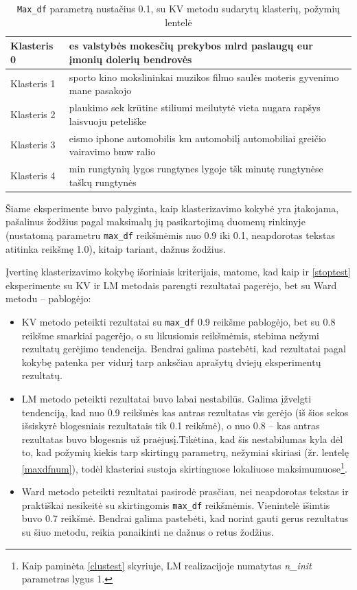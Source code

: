 \documentclass{VUMIFInfBakalaurinis}
\begin{document}
\begin{table}[H]
  \centering
  \caption{\texttt{Max\_df} parametrą nustačius 0.1, su KV metodu sudarytų klasterių,
  požymių lentelė}
  \small
  \begin{tabular}{|l|l|}
  \hline
  Klasteris 0 & es valstybės mokesčių prekybos mlrd paslaugų eur įmonių dolerių bendrovės       \\ \hline
  Klasteris 1 & sporto kino mokslininkai muzikos filmo saulės moteris gyvenimo mane pasakojo    \\ \hline
  Klasteris 2 & plaukimo sek krūtine stiliumi meilutytė vieta nugara rapšys laisvuoju peteliške \\ \hline
  Klasteris 3 & eismo iphone automobilis km automobilį automobiliai greičio vairavimo bmw ralio \\ \hline
  Klasteris 4 & min rungtynių lygos rungtynes lygoje tšk minutę rungtynėse taškų rungtynės      \\ \hline
  \end{tabular}
  \normalsize
\end{table}

Šiame eksperimente buvo palyginta, kaip klasterizavimo kokybė yra
įtakojama, pašalinus žodžius pagal maksimalų jų pasikartojimą duomenų
rinkinyje (nustatomą parametru \texttt{max\_df} reikšmėmis nuo 0.9 iki
0.1, neapdorotas tekstas atitinka reikšmę 1.0), kitaip tariant, dažnus
žodžius.

Įvertinę klasterizavimo kokybę išoriniais kriterijais, matome, kad kaip
ir \ref{stoptest}
eksperimente su KV ir LM metodais parengti rezultatai pagerėjo, bet su
Ward metodu -- pablogėjo:

\begin{itemize}
\item
  KV metodo peteikti rezultatai su \texttt{max\_df} 0.9 reikšme pablogėjo, bet su 0.8
  reikšme smarkiai pagerėjo, o su likusiomis reikšmėmis, stebima nežymi
  rezultatų gerėjimo tendencija. Bendrai galima pastebėti, kad
  rezultatai pagal kokybę patenka per vidurį tarp anksčiau aprašytų
  dviejų eksperimentų rezultatų.
\item
  LM metodo peteikti rezultatai buvo labai nestabilūs. Galima įžvelgti
  tendenciją, kad nuo 0.9 reikšmės kas antras rezultatas vis gerėjo (iš
  šios sekos išsiskyrė blogesniais rezultatais tik 0.1 reikšmė), o nuo
  0.8 -- kas antras rezultatas buvo blogesnis už praėjusį.Tikėtina, kad
  šis nestabilumas kyla dėl to, kad požymių kiekis tarp skirtingų
  parametrų, nežymiai skiriasi (žr. lentelę \ref{maxdfnum}), todėl klasteriai
  sustoja skirtinguose lokaliuose maksimumuose\footnote{Kaip paminėta
    \ref{clustest} skyriuje, LM realizacijoje
    numatytas \emph{n\_init} parametras lygus 1.}.
\item
  Ward metodo peteikti rezultatai pasirodė prasčiau, nei neapdorotas tekstas ir
  praktiškai nesikeitė su skirtingomis \texttt{max\_df} reikšmėmis. Vienintelė
  išimtis buvo 0.7 reikšmė. Bendrai galima pastebėti, kad norint gauti
  gerus rezultatus su šiuo metodu, reikia panaikinti ne dažnus o retus
  žodžius.
\end{itemize}
\end{document}
